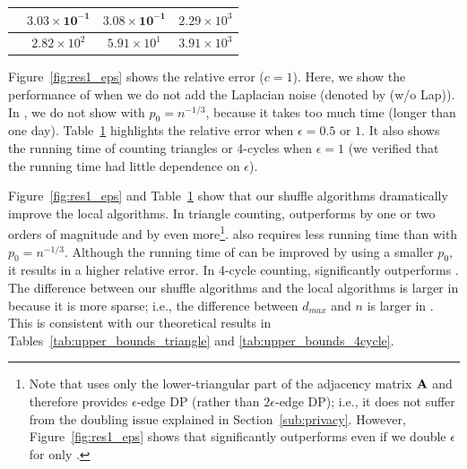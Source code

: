 \begin{table}[t]
\begin{tabular}{|c|c|c|c|}
    \AlgWSCyc{} & $\bm{3.03 \times 10^{-1}}$ & $\bm{3.08 \times 10^{-1}}$ & $2.29 \times 10^3$ \\ \hline
    \AlgWLCyc{} & $2.82 \times 10^2$ & $5.91 \times 10^1$ & $3.91 \times 10^3$ \\ \hline
  \end{tabular}
  \label{tab:res1_eps_tri_time}
\end{table}

Figure~\ref{fig:res1_eps} shows the relative error ($c=1$). 
Here, we show the performance of \AlgWSTri{} when we do not add the Laplacian noise (denoted by \AlgWSTri{} (w/o Lap)). 
In \IMDB{}, we do not show \AlgARRTri{} with $p_0 = n^{-1/3}$, because it takes too much time (longer than one day). 
Table~\ref{tab:res1_eps_tri_time} highlights the relative error when $\epsilon=0.5$ or $1$. 
It also shows the running time of counting triangles or 4-cycles when $\epsilon=1$ (we verified that the running time had little dependence on $\epsilon$). 

Figure~\ref{fig:res1_eps} and Table~\ref{tab:res1_eps_tri_time} show that our shuffle algorithms dramatically improve the local algorithms. 
In triangle counting, 
\AlgWSTriVR{} outperforms \AlgWLTri{} by one or two orders of magnitude and \AlgARRTri{} by even more\footnote{Note that \AlgARRTri{} uses only the lower-triangular part of the adjacency matrix $\mathbf{A}$ and therefore provides 
$\epsilon$-edge DP (rather than $2\epsilon$-edge DP); i.e., it does not suffer from the doubling issue explained in Section~\ref{sub:privacy}. However, Figure~\ref{fig:res1_eps} shows that \AlgWSTriVR{} significantly outperforms \AlgARRTri{} 
even if we double $\epsilon$ for only \AlgWSTriVR{}.}. 
\AlgWSTriVR{} also requires less running time than \AlgARRTri{} with $p_0 = n^{-1/3}$. 
Although the running time of \AlgARRTri{} can be improved by using a smaller $p_0$, it results in a higher relative error. 
In 4-cycle counting, 
\AlgWSCyc{} significantly outperforms \AlgWLCyc{}. 
The difference between our shuffle algorithms and the local algorithms is larger in \IMDB{} because it is more sparse; i.e., the difference between $d_{max}$ and $n$ is larger in \IMDB{}. 
This is consistent with our theoretical results in Tables~\ref{tab:upper_bounds_triangle} and \ref{tab:upper_bounds_4cycle}. 

